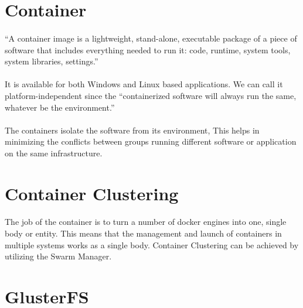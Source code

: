 \section{Container}

\paragraph{\hspace{24pt}}
“A container image is a lightweight, stand-alone, executable package of a piece of software that includes everything needed to run it: code, runtime, system tools, system libraries, settings.”

\paragraph{\hspace{24pt}}
It is available for both Windows and Linux based applications. We can call it platform-independent since the “containerized software will always run the same, whatever be the environment.”

\paragraph{\hspace{24pt}}
The containers isolate the software from its environment, This helps in minimizing the conflicts between groups running different software or application on the same infrastructure.

\section{Container Clustering}

\paragraph{\hspace{24pt}}
The job of the container is to turn a number of docker engines into one, single body or entity. This means that the management and launch of containers in multiple systems works as a single body. Container Clustering can be achieved by utilizing the Swarm Manager.

\section{GlusterFS}

